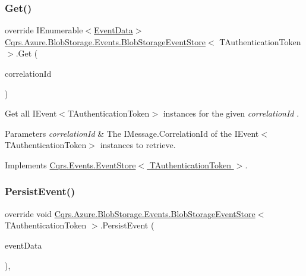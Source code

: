 \subsubsection{\texorpdfstring{Get()}{Get()}\hspace{0.1cm}{\footnotesize\ttfamily [2/2]}}
{\footnotesize\ttfamily override I\+Enumerable$<$\hyperlink{classCqrs_1_1Events_1_1EventData}{Event\+Data}$>$ \hyperlink{classCqrs_1_1Azure_1_1BlobStorage_1_1Events_1_1BlobStorageEventStore}{Cqrs.\+Azure.\+Blob\+Storage.\+Events.\+Blob\+Storage\+Event\+Store}$<$ T\+Authentication\+Token $>$.Get (\begin{DoxyParamCaption}\item[{Guid}]{correlation\+Id }\end{DoxyParamCaption})\hspace{0.3cm}{\ttfamily [virtual]}}



Get all I\+Event$<$\+T\+Authentication\+Token$>$ instances for the given {\itshape correlation\+Id} . 


\begin{DoxyParams}{Parameters}
{\em correlation\+Id} & The I\+Message.\+Correlation\+Id of the I\+Event$<$\+T\+Authentication\+Token$>$ instances to retrieve.\\
\hline
\end{DoxyParams}


Implements \hyperlink{classCqrs_1_1Events_1_1EventStore_a0096646f5dff730b0041b9469719c420_a0096646f5dff730b0041b9469719c420}{Cqrs.\+Events.\+Event\+Store$<$ T\+Authentication\+Token $>$}.

\mbox{\label{classCqrs_1_1Azure_1_1BlobStorage_1_1Events_1_1BlobStorageEventStore_aa27a352076b8967498407d24814f7c83_aa27a352076b8967498407d24814f7c83}} 
\subsubsection{\texorpdfstring{Persist\+Event()}{PersistEvent()}}
{\footnotesize\ttfamily override void \hyperlink{classCqrs_1_1Azure_1_1BlobStorage_1_1Events_1_1BlobStorageEventStore}{Cqrs.\+Azure.\+Blob\+Storage.\+Events.\+Blob\+Storage\+Event\+Store}$<$ T\+Authentication\+Token $>$.Persist\+Event (\begin{DoxyParamCaption}\item[{\hyperlink{classCqrs_1_1Events_1_1EventData}{Event\+Data}}]{event\+Data }\end{DoxyParamCaption})\hspace{0.3cm}{\ttfamily [protected]}, {\ttfamily [virtual]}}



